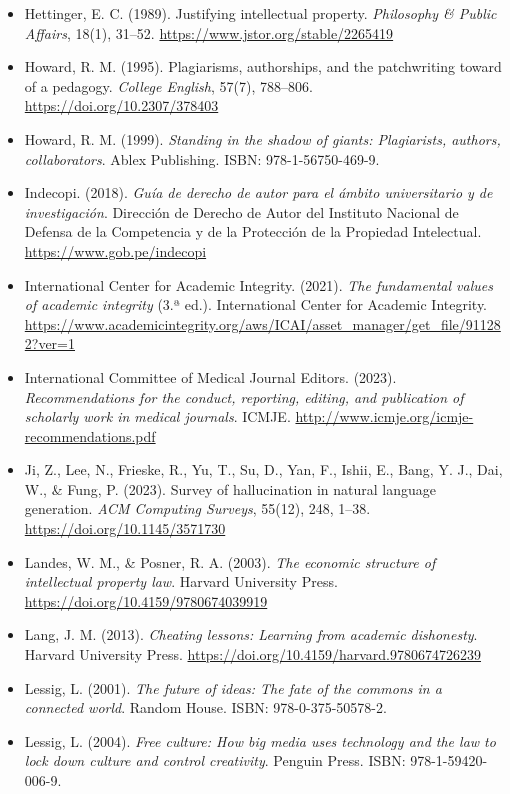 \begin{itemize}[leftmargin=1.5em, label={}, itemsep=0.22ex, parsep=0pt]
\item Hettinger, E. C. (1989). Justifying intellectual property. \textit{Philosophy \& Public Affairs}, 18(1), 31--52. \url{https://www.jstor.org/stable/2265419}
\item Howard, R. M. (1995). Plagiarisms, authorships, and the patchwriting toward of a pedagogy. \textit{College English}, 57(7), 788--806. \url{https://doi.org/10.2307/378403}
\item Howard, R. M. (1999). \textit{Standing in the shadow of giants: Plagiarists, authors, collaborators}. Ablex Publishing. ISBN: 978-1-56750-469-9.
\item Indecopi. (2018). \textit{Guía de derecho de autor para el ámbito universitario y de investigación}. Dirección de Derecho de Autor del Instituto Nacional de Defensa de la Competencia y de la Protección de la Propiedad Intelectual. \url{https://www.gob.pe/indecopi}
\item International Center for Academic Integrity. (2021). \textit{The fundamental values of academic integrity} (3.ª ed.). International Center for Academic Integrity. \url{https://www.academicintegrity.org/aws/ICAI/asset_manager/get_file/911282?ver=1}
\item International Committee of Medical Journal Editors. (2023). \textit{Recommendations for the conduct, reporting, editing, and publication of scholarly work in medical journals}. ICMJE. \url{http://www.icmje.org/icmje-recommendations.pdf}
\item Ji, Z., Lee, N., Frieske, R., Yu, T., Su, D., Yan, F., Ishii, E., Bang, Y. J., Dai, W., \& Fung, P. (2023). Survey of hallucination in natural language generation. \textit{ACM Computing Surveys}, 55(12), 248, 1--38. \url{https://doi.org/10.1145/3571730}
\item Landes, W. M., \& Posner, R. A. (2003). \textit{The economic structure of intellectual property law}. Harvard University Press. \url{https://doi.org/10.4159/9780674039919}
\item Lang, J. M. (2013). \textit{Cheating lessons: Learning from academic dishonesty}. Harvard University Press. \url{https://doi.org/10.4159/harvard.9780674726239}
\item Lessig, L. (2001). \textit{The future of ideas: The fate of the commons in a connected world}. Random House. ISBN: 978-0-375-50578-2.
\item Lessig, L. (2004). \textit{Free culture: How big media uses technology and the law to lock down culture and control creativity}. Penguin Press. ISBN: 978-1-59420-006-9.

\end{itemize}
